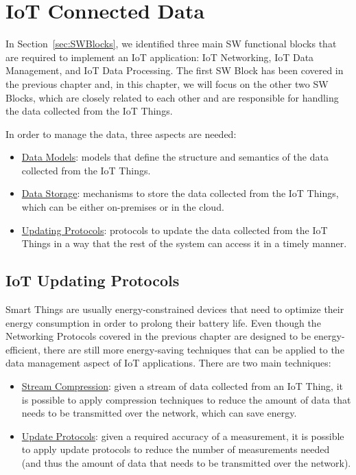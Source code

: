 \chapter{IoT Connected Data}

In Section~\ref{sec:SWBlocks}, we identified three main SW functional blocks that are required to implement an IoT application: IoT Networking, IoT Data Management, and IoT Data Processing. The first SW Block has been covered in the previous chapter and, in this chapter, we will focus on the other two SW Blocks, which are closely related to each other and are responsible for handling the data collected from the IoT Things.

In order to manage the data, three aspects are needed:
\begin{itemize}
    \item \ul{Data Models}: models that define the structure and semantics of the data collected from the IoT Things.
    \item \ul{Data Storage}: mechanisms to store the data collected from the IoT Things, which can be either on-premises or in the cloud.
    \item \ul{Updating Protocols}: protocols to update the data collected from the IoT Things in a way that the rest of the system can access it in a timely manner.
\end{itemize}

\section{IoT Updating Protocols}

Smart Things are usually energy-constrained devices that need to optimize their energy consumption in order to prolong their battery life. Even though the Networking Protocols covered in the previous chapter are designed to be energy-efficient, there are still more energy-saving techniques that can be applied to the data management aspect of IoT applications. There are two main techniques:
\begin{itemize}
    \item \ul{Stream Compression}: given a stream of data collected from an IoT Thing, it is possible to apply compression techniques to reduce the amount of data that needs to be transmitted over the network, which can save energy.
    \item \ul{Update Protocols}: given a required accuracy of a measurement, it is possible to apply update protocols to reduce the number of measurements needed (and thus the amount of data that needs to be transmitted over the network).
\end{itemize}

